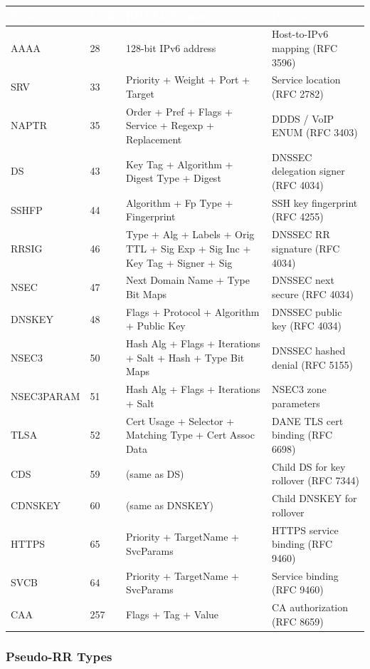 \documentclass[11pt,letterpaper]{article}
\newcommand{\tableheader}[1]{\textbf{\sffamily\textcolor{white}{#1}}}
\begin{document}
\begin{center}
\begin{tabularx}{\textwidth}{C{1.4cm}C{1cm}XL{3.8cm}}
\toprule
{}
\tableheader{Type} & \tableheader{Code} & \tableheader{RDATA Format} & \tableheader{Purpose} \\
\midrule
AAAA & 28 & 128-bit IPv6 address & Host-to-IPv6 mapping (RFC 3596) \\
SRV & 33 & Priority + Weight + Port + Target & Service location (RFC 2782) \\
NAPTR & 35 & Order + Pref + Flags + Service + Regexp + Replacement & DDDS / VoIP ENUM (RFC 3403) \\
DS & 43 & Key Tag + Algorithm + Digest Type + Digest & DNSSEC delegation signer (RFC 4034) \\
SSHFP & 44 & Algorithm + Fp Type + Fingerprint & SSH key fingerprint (RFC 4255) \\
RRSIG & 46 & Type + Alg + Labels + Orig TTL + Sig Exp + Sig Inc + Key Tag + Signer + Sig & DNSSEC RR signature (RFC 4034) \\
NSEC & 47 & Next Domain Name + Type Bit Maps & DNSSEC next secure (RFC 4034) \\
DNSKEY & 48 & Flags + Protocol + Algorithm + Public Key & DNSSEC public key (RFC 4034) \\
NSEC3 & 50 & Hash Alg + Flags + Iterations + Salt + Hash + Type Bit Maps & DNSSEC hashed denial (RFC 5155) \\
NSEC3PARAM & 51 & Hash Alg + Flags + Iterations + Salt & NSEC3 zone parameters \\
TLSA & 52 & Cert Usage + Selector + Matching Type + Cert Assoc Data & DANE TLS cert binding (RFC 6698) \\
CDS & 59 & (same as DS) & Child DS for key rollover (RFC 7344) \\
CDNSKEY & 60 & (same as DNSKEY) & Child DNSKEY for rollover \\
HTTPS & 65 & Priority + TargetName + SvcParams & HTTPS service binding (RFC 9460) \\
SVCB & 64 & Priority + TargetName + SvcParams & Service binding (RFC 9460) \\
CAA & 257 & Flags + Tag + Value & CA authorization (RFC 8659) \\
\bottomrule
\end{tabularx}
\end{center}

\subsubsection{Pseudo-RR Types}
\end{document}
